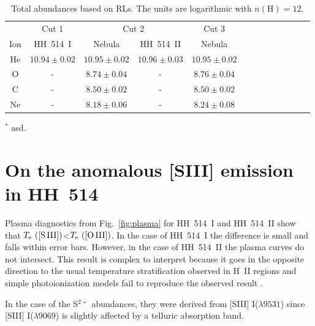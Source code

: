 \documentclass[fleqn,usenatbib]{mnras}
\begin{document}
\begin{table}
\centering
\caption{Total abundances based on RLs.  The units are logarithmic with $n(\text{H})=12$.}
\label{tab:total_abundances_rls}
\begin{tabular}{ccccccccccccc}
\hline
 & \multicolumn{1}{c}{Cut 1} & \multicolumn{2}{c}{Cut 2} & \multicolumn{1}{c}{Cut 3} & \\
Ion &  HH~514~I & Nebula & HH~514~II  & Nebula \\
\hline

He  & $10.94 \pm 0.02$ & $10.95 \pm 0.02$ & $10.96 \pm 0.03$&$10.95 \pm 0.02$\\

O  &  - & $8.74 \pm 0.04$ &-&$8.76 \pm 0.04$\\ 

C & - &$8.50 \pm 0.02$ &-&$8.50 \pm 0.02$\\ 

Ne  & - &$8.18 \pm 0.06$&-&$8.24 \pm 0.08$\\

\hline
\end{tabular}
\begin{description}
\item $^*$ asd. \\
\end{description}
\end{table}


\section{On the anomalous [S\thinspace III] emission in HH~514}
\label{sec:under_TS3}

Plasma diagnostics from Fig.~\ref{fig:plasma} for HH~514~I and HH~514~II show that $T_{\rm e} \text{ ([S\thinspace III])}$<$T_{\rm e} \text{ ([O\thinspace III])}$. In the case of HH~514~I the difference is small and falls within error bars. However, in the case of HH~514~II the plasma curves do not intersect. This result is complex to interpret because it goes in the opposite direction to the usual temperature stratification observed in H~II regions and simple photoionization models fail to reproduce the observed result \citep[][]{Binette2012}.

In the case of the S$^{2+}$ abundances, they were derived from [S\thinspace III] I($\lambda 9531$) since [S\thinspace III] I($\lambda 9069$) is slightly affected by a telluric absorption band. 
\end{document}

